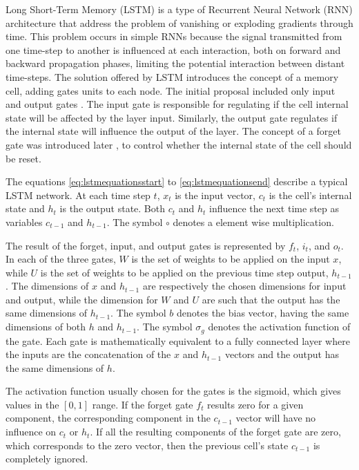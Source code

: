 Long Short-Term Memory\cite{hochreiter_long_1997} (LSTM) is a type of Recurrent Neural Network (RNN) architecture that address the problem of vanishing or exploding gradients through time. This problem occurs in simple RNNs because the signal transmitted from one time-step to another is influenced at each interaction, both on forward and backward propagation phases, limiting the potential interaction between distant time-steps. The solution offered by LSTM introduces the concept of a memory cell, adding gates units to each node. The initial proposal included only input and output gates \cite{hochreiter_long_1997}.
The input gate is responsible for regulating if the cell internal state will be affected by the layer input. Similarly, the output gate regulates if the internal state will influence the output of the layer. The concept of a forget gate was introduced later \cite{gers_learning_1999}, to control whether the internal state of the cell should be reset.

The equations \eqref{eq:lstmequationsstart} to \eqref{eq:lstmequationsend} describe a typical LSTM network. At each time step $t$, $x_t$ is the input vector, $c_t$ is the cell's internal state and $h_t$ is the output state. Both $c_t$ and $h_t$ influence the next time step as variables $c_{t-1}$ and $h_{t-1}$. The symbol $\circ$ denotes a element wise multiplication.


The result of the forget, input, and output gates is represented by $f_t$, $i_t$, and $o_t$.
In each of the three gates, $W$ is the set of weights to be applied on the input $x$, while $U$ is the set of weights to be applied on the previous time step output, $h_{t-1}$. 
The dimensions of $x$ and $h_{t-1}$ are respectively the chosen dimensions for input and output, while the dimension for $W$ and $U$ are such that the output has the same dimensions of $h_{t-1}$.  The symbol $b$ denotes the bias vector, having the same dimensions of both $h$ and $h_{t-1}$. The symbol $\sigma_g$ denotes the activation function of the gate. Each gate is mathematically equivalent to a fully connected layer where the inputs are the concatenation of the $x$ and $h_{t-1}$ vectors and the output has the same dimensions of $h$.

The activation function usually chosen for the gates is the sigmoid, which gives values in the $[0,1]$ range. If the forget gate $f_t$ results zero for a given component, the corresponding component in the $c_{t-1}$ vector will have no influence on $c_t$ or $h_t$. If all the resulting components of the forget gate are zero, which corresponds to the zero vector, then the previous cell's state $c_{t-1}$ is completely ignored.

